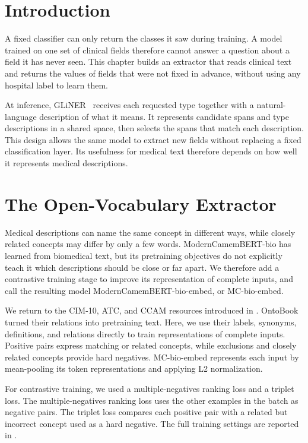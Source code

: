 \section{Introduction}

A fixed classifier can only return the classes it saw during training. A model
trained on one set of clinical fields therefore cannot answer a question about a
field it has never seen. This chapter builds an extractor that reads clinical
text and returns the values of fields that were not fixed in advance, without
using any hospital label to learn them.

At inference, GLiNER~\citep{zaratiana2024gliner} receives each requested type
together with a natural-language description of what it means. It represents
candidate spans and type descriptions in a shared space, then selects the spans that match each
description. This design allows the same model to
extract new fields without replacing a fixed classification layer. Its usefulness
for medical text therefore depends on how well it represents medical
descriptions.


\section{The Open-Vocabulary Extractor}

Medical descriptions can name the same concept in different ways, while closely
related concepts may differ by only a few words. ModernCamemBERT-bio has learned
from biomedical text, but its pretraining objectives do not explicitly teach it
which descriptions should be close or far apart. We therefore add a contrastive
training stage to improve its representation of complete inputs, and call the
resulting model ModernCamemBERT-bio-embed, or MC-bio-embed.

We return to the CIM-10, ATC, and CCAM resources introduced in
. OntoBook turned their relations into pretraining text.
Here, we use their labels, synonyms, definitions, and relations directly to
train representations of complete inputs. Positive pairs express matching or
related concepts, while exclusions and closely related concepts provide hard
negatives. MC-bio-embed represents each input by mean-pooling its token
representations and applying L2 normalization.



For contrastive training, we used a multiple-negatives ranking loss and a
triplet loss. The multiple-negatives ranking loss uses the other examples in the
batch as negative pairs. The triplet loss compares each positive pair with a
related but incorrect concept used as a hard negative. The full training
settings are reported in .

